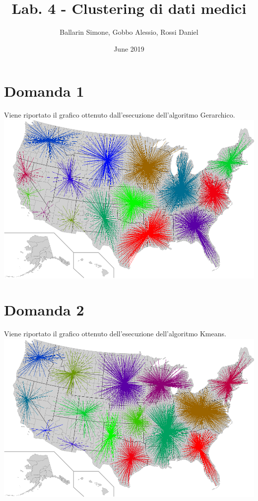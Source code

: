 \documentclass{article}
\title{Lab. 4 - Clustering di dati medici}
\author{Ballarin Simone, Gobbo Alessio, Rossi Daniel}
\date{June 2019}
\begin{document}
\maketitle

\section*{Domanda 1}
Viene riportato il grafico ottenuto dall'esecuzione dell'algoritmo Gerarchico.\\
\includegraphics[width=1.0\linewidth, valign=t]{figures/Domanda2}

\section*{Domanda 2}
Viene riportato il grafico ottenuto dell'esecuzione dell'algoritmo Kmeans.\\
\includegraphics[width=1.0\linewidth, valign=t]{figures/Domanda1}
\end{document}
